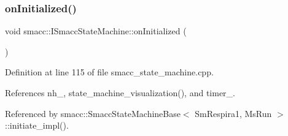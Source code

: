 \subsubsection{\texorpdfstring{on\+Initialized()}{onInitialized()}}
{\footnotesize\ttfamily void smacc\+::\+I\+Smacc\+State\+Machine\+::on\+Initialized (\begin{DoxyParamCaption}{ }\end{DoxyParamCaption})\hspace{0.3cm}{\ttfamily [protected]}}



Definition at line 115 of file smacc\+\_\+state\+\_\+machine.\+cpp.



References nh\+\_\+, state\+\_\+machine\+\_\+visualization(), and timer\+\_\+.



Referenced by smacc\+::\+Smacc\+State\+Machine\+Base$<$ Sm\+Respira1, Ms\+Run $>$\+::initiate\+\_\+impl().


